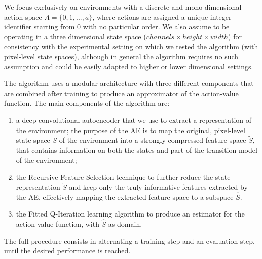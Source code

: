 We focus exclusively on environments with a discrete and mono-dimensional 
action space $A = \{0, 1, ..., a\}$, where actions are assigned a unique integer 
identifier starting from $0$ with no particular order. 
We also assume to be operating in a three dimensional state space 
($channels \times height \times width$) for consistency with the experimental 
setting on which we tested the algorithm (with pixel-level state spaces), 
although in general the algorithm requires no such assumption and could be 
easily adapted to higher or lower dimensional settings. 

The algorithm uses a modular architecture with three different components that 
are combined after training to produce an approximator of the action-value 
function. The main components of the algorithm are:
%
\begin{enumerate}
    \item a deep convolutional autoencoder that we use to extract a 
    representation of the environment;
    the purpose of the AE is to map the original, pixel-level state space $S$ of
    the environment into a strongly compressed feature space ${\tilde{S}}$, 
    that contains information on both the states and part of the transition 
    model of the environment;
    \item the Recursive Feature Selection technique to further 
    reduce the state representation $\tilde{S}$ and keep only the truly 
    informative features extracted by the AE, effectively mapping the extracted 
    feature space to a subspace $\hat{S}$.
    \item the Fitted Q-Iteration learning algorithm to produce an 
    estimator for the action-value function, with $\hat{S}$ as domain. 
\end{enumerate}
%
The full procedure consists in alternating a training step and an evaluation 
step, until the desired performance is reached.
%
